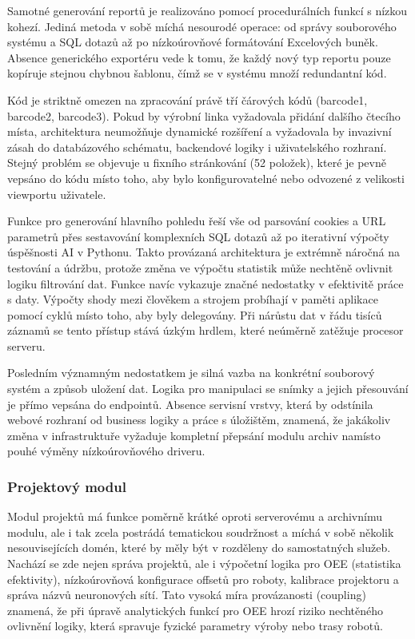 \documentclass[FM,DP,fonts]{tulthesis}
\begin{document}
Samotné generování reportů je realizováno pomocí procedurálních funkcí s nízkou kohezí. Jediná metoda v sobě míchá nesourodé operace: od správy souborového systému a SQL dotazů až po nízkoúrovňové formátování Excelových buněk. Absence generického exportéru vede k tomu, že každý nový typ reportu pouze kopíruje stejnou chybnou šablonu, čímž se v systému množí redundantní kód.

Kód je striktně omezen na zpracování právě tří čárových kódů (barcode1, barcode2, barcode3). Pokud by výrobní linka vyžadovala přidání dalšího čtecího místa, architektura neumožňuje dynamické rozšíření a vyžadovala by invazivní zásah do databázového schématu, backendové logiky i uživatelského rozhraní. Stejný problém se objevuje u fixního stránkování (52 položek), které je pevně vepsáno do kódu místo toho, aby bylo konfigurovatelné nebo odvozené z velikosti viewportu uživatele.

Funkce pro generování hlavního pohledu řeší vše od parsování cookies a URL parametrů přes sestavování komplexních SQL dotazů až po iterativní výpočty úspěšnosti AI v Pythonu. Takto provázaná architektura je extrémně náročná na testování a údržbu, protože změna ve výpočtu statistik může nechtěně ovlivnit logiku filtrování dat. Funkce navíc vykazuje značné nedostatky v efektivitě práce s daty. Výpočty shody mezi člověkem a strojem probíhají v paměti aplikace pomocí cyklů místo toho, aby byly delegovány. Při nárůstu dat v řádu tisíců záznamů se tento přístup stává úzkým hrdlem, které neúměrně zatěžuje procesor serveru.

Posledním významným nedostatkem je silná vazba na konkrétní souborový systém a způsob uložení dat. Logika pro manipulaci se snímky a jejich přesouvání je přímo vepsána do endpointů. Absence servisní vrstvy, která by odstínila webové rozhraní od business logiky a práce s úložištěm, znamená, že jakákoliv změna v infrastruktuře vyžaduje kompletní přepsání modulu archiv namísto pouhé výměny nízkoúrovňového driveru.

\subsubsection{Projektový modul}
Modul projektů má funkce poměrně krátké oproti serverovému a archivnímu modulu, ale i tak zcela postrádá tematickou soudržnost a míchá v sobě několik nesouvisejících domén, které by měly být v rozděleny do samostatných služeb. Nachází se zde nejen správa projektů, ale i výpočetní logika pro OEE (statistika efektivity), nízkoúrovňová konfigurace offsetů pro roboty, kalibrace projektoru a správa názvů neuronových sítí. Tato vysoká míra provázanosti (coupling) znamená, že při úpravě analytických funkcí pro OEE hrozí riziko nechtěného ovlivnění logiky, která spravuje fyzické parametry výroby nebo trasy robotů.
\end{document}
